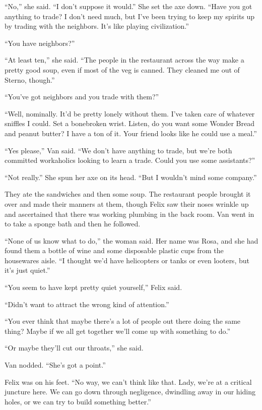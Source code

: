 “No,” she said. “I don’t suppose it would.” She set the axe down.
“Have you got anything to trade? I don’t need much, but I’ve been
trying to keep my spirits up by trading with the neighbors. It’s
like playing civilization.”

“You have neighbors?”

“At least ten,” she said. “The people in the restaurant across the
way make a pretty good soup, even if most of the veg is canned.
They cleaned me out of Sterno, though.”

“You’ve got neighbors and you trade with them?”

“Well, nominally. It’d be pretty lonely without them. I’ve taken
care of whatever sniffles I could. Set a bone\dash{}broken wrist. Listen,
do you want some Wonder Bread and peanut butter? I have a ton of
it. Your friend looks like he could use a meal.”

“Yes please,” Van said. “We don’t have anything to trade, but we’re
both committed workaholics looking to learn a trade. Could you use
some assistants?”

“Not really.” She spun her axe on its head. “But I wouldn’t mind
some company.”

They ate the sandwiches and then some soup. The restaurant people
brought it over and made their manners at them, though Felix saw
their noses wrinkle up and ascertained that there was working
plumbing in the back room. Van went in to take a sponge bath and
then he followed.

“None of us know what to do,” the woman said. Her name was Rosa,
and she had found them a bottle of wine and some disposable plastic
cups from the housewares aisle. “I thought we’d have helicopters or
tanks or even looters, but it’s just quiet.”

“You seem to have kept pretty quiet yourself,” Felix said.

“Didn’t want to attract the wrong kind of attention.”

“You ever think that maybe there’s a lot of people out there doing
the same thing? Maybe if we all get together we’ll come up with
something to do.”

“Or maybe they’ll cut our throats,” she said.

Van nodded. “She’s got a point.”

Felix was on his feet. “No way, we can’t think like that. Lady,
we’re at a critical juncture here. We can go down through
negligence, dwindling away in our hiding holes, or we can try to
build something better.”

